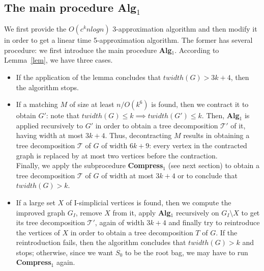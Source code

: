 \documentclass{article}
\theoremstyle{definition}
\theoremstyle{lemma}
\theoremstyle{corollary}
\theoremstyle{theorem}
\begin{document}
\subsection{The main procedure \textbf{Alg$_1$}}
We first provide the $O(c^knlogn)$ 3-approximation algorithm and then modify it in order to get a linear time 5-approximation algorithm. The former has several procedure: we first introduce the main procedure \textbf{Alg$_1$}.
According to Lemma~\ref{lem}, we have three cases.
\begin{itemize}
	\item If the application of the lemma concludes that $twidth(G) > 3k + 4$, then the algorithm stops.
	\item If a matching $M$ of size at least $n/O(k^6)$ is found, then we contract it to obtain $G'$:
	note that $twidth(G) \leq k \implies twidth(G') \leq k$. Then, \textbf{Alg$_1$} is applied 
	recursively to $G'$ in order to obtain a tree decomposition $\mathcal{T'}$ of it, having width 
	at most $3k + 4$.
	Thus, decontracting $M$ results in obtaining a tree decomposition $\mathcal{T}$ of $G$ of width 
	$6k + 9$: every vertex in the contracted graph is replaced by at most two vertices before the
	contraction. \\
	Finally, we apply the subprocedure \textbf{Compress$_1$} (see next section) to obtain a tree
	decomposition $\mathcal{T}$ of $G$ of width at most $3k + 4$ or to conclude that $twidth(G) > k$.
	\item If a large set $X$ of I-simplicial vertices is found, then we compute the improved graph $G_I$,
	remove $X$ from it, apply \textbf{Alg$_1$} recursively on $G_I \setminus X$ to get its tree
	decomposition $\mathcal{T'}$, again of width $3k + 4$ and finally try to reintroduce the vertices of
	$X$ in order to obtain a tree decomposition $T$ of $G$. If the reintroduction fails, then the
	algorithm concludes that $twidth(G) > k$ and stops; otherwise, since we want $S_0$ to be the root
	bag, we may have to run \textbf{Compress$_1$} again.
\end{itemize}
\end{document}
